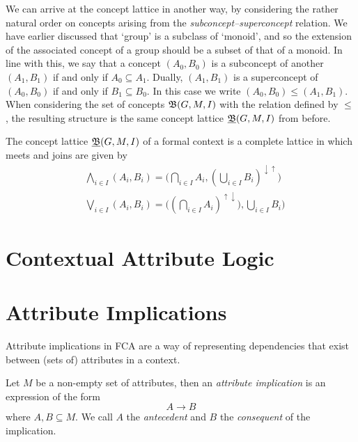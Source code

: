 We can arrive at the concept lattice in another way, by considering the rather natural order on concepts arising from the \textit{subconcept--superconcept}
relation. We have earlier discussed that `group' is a subclass of `monoid', and so the extension of the associated concept of a group should
be a subset of that of a monoid. In line with this, we say that a concept $(A_{0},B_{0})$ is a subconcept of another $(A_{1},B_{1})$ if and only
if $A_{0}\subseteq A_{1}$. Dually, $(A_{1},B_{1})$ is a superconcept of $(A_{0},B_{0})$ if and only if $B_{1}\subseteq B_{0}$. In this case
we write $(A_{0},B_{0}) \leq (A_{1},B_{1})$. When considering the set of concepts ${\mathfrak B} (G,M,\mathrel{I})$ with the relation defined by $\leq$, the resulting
structure is the same concept lattice $\underline{{\mathfrak B}} (G,M,\mathrel{I})$ from before.

\begin{theorem}
  \label{theorem:basic-theorem} The concept lattice $\underline{{\mathfrak B}} (G,M,\mathrel{I})$ of a formal context is a complete lattice in which meets and joins are given by
  \begin{align*}
     & \underset{i \in I}\bigwedge (A_{i}, B_{i}) = \Big( \underset{i \in I}\bigcap A_{i}, (\underset{i \in I}\bigcup B_{i})^{\downarrow \uparrow}\Big) \\
     & \underset{i \in I}\bigvee (A_{i}, B_{i}) = \Big( (\underset{i \in I}\bigcap A_{i})^{\uparrow \downarrow}), \underset{i \in I}\bigcup B_{i}\Big)
  \end{align*}
\end{theorem}

\section{Contextual Attribute Logic}
\label{section:contextual-attribute-logic}

\section{Attribute Implications}
\label{section:attribute-implications}

Attribute implications in FCA are a way of representing dependencies that exist between (sets of) attributes in a context.

\begin{definition}
  \label{definition:attribute-implication} Let $M$ be a non-empty set of attributes, then an \emph{attribute implication} is an expression of
  the form
  \[
    A \rightarrow B
  \]
  where $A,B \subseteq M$. We call $A$ the \emph{antecedent} and $B$ the \emph{consequent} of the implication.
\end{definition}

